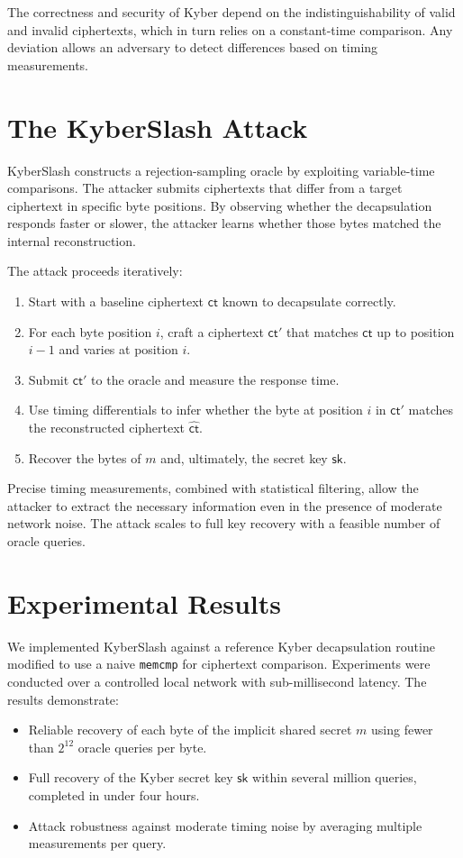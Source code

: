 \documentclass[11pt]{article}
\begin{document}
The correctness and security of Kyber depend on the indistinguishability of valid and invalid ciphertexts, which in turn relies on a constant-time comparison. Any deviation allows an adversary to detect differences based on timing measurements.

\section{The KyberSlash Attack}
KyberSlash constructs a rejection-sampling oracle by exploiting variable-time comparisons. The attacker submits ciphertexts that differ from a target ciphertext in specific byte positions. By observing whether the decapsulation responds faster or slower, the attacker learns whether those bytes matched the internal reconstruction.

The attack proceeds iteratively:
\begin{enumerate}
    \item Start with a baseline ciphertext $\mathsf{ct}$ known to decapsulate correctly.
    \item For each byte position $i$, craft a ciphertext $\mathsf{ct}'$ that matches $\mathsf{ct}$ up to position $i-1$ and varies at position $i$.
    \item Submit $\mathsf{ct}'$ to the oracle and measure the response time.
    \item Use timing differentials to infer whether the byte at position $i$ in $\mathsf{ct}'$ matches the reconstructed ciphertext $\hat{\mathsf{ct}}$.
    \item Recover the bytes of $m$ and, ultimately, the secret key $\mathsf{sk}$.
\end{enumerate}

Precise timing measurements, combined with statistical filtering, allow the attacker to extract the necessary information even in the presence of moderate network noise. The attack scales to full key recovery with a feasible number of oracle queries.

\section{Experimental Results}
We implemented KyberSlash against a reference Kyber decapsulation routine modified to use a naive \texttt{memcmp} for ciphertext comparison. Experiments were conducted over a controlled local network with sub-millisecond latency. The results demonstrate:
\begin{itemize}
    \item Reliable recovery of each byte of the implicit shared secret $m$ using fewer than $2^{12}$ oracle queries per byte.
    \item Full recovery of the Kyber secret key $\mathsf{sk}$ within several million queries, completed in under four hours.
    \item Attack robustness against moderate timing noise by averaging multiple measurements per query.
\end{itemize}
\end{document}

